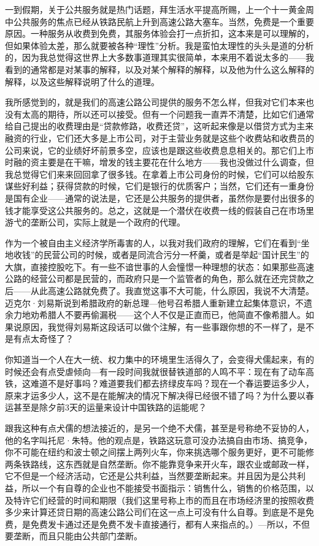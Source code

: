 一到假期，关于公共服务就是热门话题，拜生活水平提高所赐，上一个十一黄金周中公共服务的焦点已经从铁路民航上升到高速公路大塞车。当然，免费是一个重要原因。一种服务从收费到免费，其服务体验会打一点折扣，这本来是可以理解的，但如果体验太差，那么就要被各种``理性''分析。我是蛮怕太理性的头头是道的分析的，因为我总觉得这世界上大多数事道理其实很简单，本来用不着说太多的------我看到的通常都是对某事的解释，以及对某个解释的解释，以及他为什么这么解释的解释，以及这些解释说明了什么的道理。

我所感觉到的，就是我们的高速公路公司提供的服务不怎么样，但我对它们本来也没有太高的期待，所以还可以接受。但有一个问题我一直弄不清楚，比如它们通常给自己提出的收费理由是``贷款修路，收费还贷''，这听起来像是以借贷方式为主来融资的行业，它们还大多是上市公司，对于主营业务就是这些个收费站和收费员的公司来说，它的业绩好坏前景多空，应该也是跟这些收费息息相关的。那它们上市时融的资主要是在干嘛，增发的钱主要花在什么地方------我也没做过什么调查，但我总觉得它们来来回回拿了很多钱。在拿着上市公司身份的时候，它们可以给股东谋些好利益；获得贷款的时候，它们是银行的优质客户；当然，它们还有一重身份是国有企业------通常的说法是，它还是公共服务的提供者，虽然你是要付出很多的钱才能享受这公共服务的。总之，这就是一个潜伏在收费一线的假装自己在市场里游弋的垄断公司，实际上就是一个政府的代理。

作为一个被自由主义经济学所毒害的人，以我对我们政府的理解，它们在看到``坐地收钱''的民营公司的时候，或者是同流合污分一杯羹，或者是举起``国计民生''的大旗，直接控股吃下。有一些不谙世事的人会憧憬一种理想的状态：如果那些高速公路的经营公司都是民营的，而政府只是一个监管者的角色，那么就在还完贷款之后------从此高速公路就免费了。我直觉这事不大可能，什么原因，我说不大清楚。迈克尔·刘易斯说到希腊政府的新总理---他号召希腊人重新建立起集体意识，不遗余力地劝希腊人不要再偷漏税------这个人不仅是正直而已，他简直不像希腊人。如果说原因，我觉得刘易斯这段话可以做个注解，有一些事跟你想的不一样了，是不是有点太奇怪了？

你知道当一个人在大一统、权力集中的环境里生活得久了，会变得犬儒起来，有的时候还会有点受虐倾向---有一段时间我就很替铁道部的人鸣不平：现在有了动车高铁，这难道不是好事吗？难道要我们都去挤绿皮车吗？现在一个春运要运多少人，原来才运多少人，这不是在能解决的情况下解决得已经很不错了吗？为什么要以春运甚至是除夕前3天的运量来设计中国铁路的运能呢？

跟我这种有点犬儒的想法接近的，是另一个绝不犬儒，甚至是号称绝不妥协的人，他的名字叫托尼·朱特。他的观点是，铁路这玩意可没办法搞自由市场、搞竞争，你不可能在纽约和波士顿之间摆上两列火车，你来挑选哪个服务更好，更不可能修两条铁路线，这东西就是自然垄断。你不能靠竞争来开火车，跟农业或邮政一样，它不但是一个经济活动，它还是公共利益，当然要垄断起来。并且因为是公共利益，所以一个有自尊的企业也不能接受书面指示：销售什么，销售的价格范围，以及特许它们经营的时间和期限（我们这里号称上市的而且在市场经济里的按照收费多少来计算还贷日期的高速公路公司们在这一点上可没有什么自尊。到底是不是免费，是免费发卡通过还是免费不发卡直接通行，都有人来指点的。）---所以，不但要垄断，而且只能由公共部门垄断。

